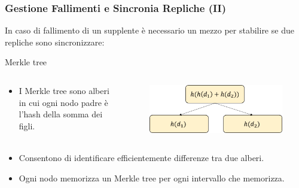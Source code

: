 \begin{frame}
  \frametitle{Gestione Fallimenti e Sincronia Repliche (II)}
    In caso di fallimento di un supplente è necessario un mezzo per stabilire se due repliche sono sincronizzare:
    \begin{block}{Merkle tree}
    \begin{columns}
    \begin{column}{0.4\textwidth}
      \begin{itemize}
      \item I \alert{Merkle tree} sono alberi in cui ogni nodo padre è l'hash della somma dei figli.
      \end{itemize}
      \end{column}
      \begin{column}{0.5\textwidth}
        \begin{figure}
        \centering
        \includegraphics[scale=0.4]{dynamo/merkle-tree.png}
        \end{figure}
      \end{column}
    \end{columns}
    \begin{itemize}
      \item Consentono di identificare efficientemente differenze tra due alberi.
      \item Ogni nodo memorizza un Merkle tree per ogni intervallo che memorizza.
    \end{itemize}
  \end{block}
\end{frame}


